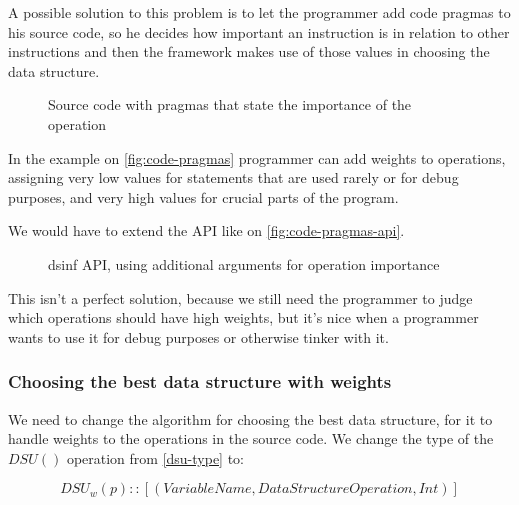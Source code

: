\documentclass[a4paper,11pt]{article}
\begin{document}
			A possible solution to this problem is to let the programmer add code pragmas to his source
			code, so he decides how important an instruction is in relation to other instructions and then
			the framework makes use of those values in choosing the data structure.

            \begin{figure}[!h]
				

				\caption{Source code with pragmas that state the importance of the operation}

				\label{fig:code-pragmas}
			\end{figure}

            In the example on \autoref{fig:code-pragmas} programmer can add weights to operations, assigning very low values
			for statements that are used rarely or for debug purposes, and very high values for crucial
			parts of the program.

            We would have to extend the API like on \autoref{fig:code-pragmas-api}.

            \begin{figure}[!h]
				

				\caption{dsinf API, using additional arguments for operation importance}

				\label{fig:code-pragmas-api}
			\end{figure}

			This isn't a perfect solution, because we still need the programmer to judge which operations
			should have high weights, but it's nice when a programmer wants to use it for debug purposes or
			otherwise tinker with it.

		\subsubsection{Choosing the best data structure with weights} \label{sec:choose-weights}

			We need to change the algorithm for choosing the best data structure, for it to handle weights
			to the operations in the source code. We change the type of the $DSU()$ operation from
			\autoref{dsu-type} to:

			\begin{equation}
				\mathit{DSU}_w(p) :: [(\mathit{VariableName}, \mathit{DataStructureOperation}, \mathit{Int})]
			\end{equation}
\end{document}
